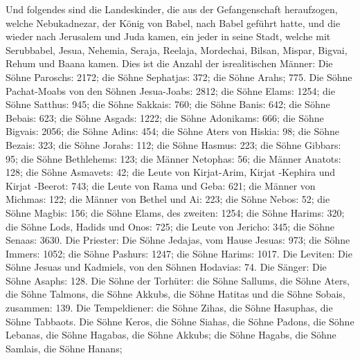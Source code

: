  Und folgendes sind die Landeskinder, die aus der
Gefangenschaft heraufzogen, welche Nebukadnezar, der König von Babel,
nach Babel geführt hatte, und die wieder nach Jerusalem und Juda kamen,
ein jeder in seine Stadt,  welche mit Serubbabel, Jesua,
Nehemia, Seraja, Reelaja, Mordechai, Bilsan, Mispar, Bigvai, Rehum und
Baana kamen. Dies ist die Anzahl der isrealitischen Männer:
 Die Söhne Paroschs: 2172;  die Söhne
Sephatjas: 372;  die Söhne Arahs; 775.  Die
Söhne Pachat-Moabs von den Söhnen Jesua-Joabs: 2812;  die
Söhne Elams: 1254;  die Söhne Satthus: 945; 
die Söhne Sakkais: 760;  die Söhne Banis: 642;
 die Söhne Bebais: 623;  die Söhne Asgads:
1222;  die Söhne Adonikams: 666;  die
Söhne Bigvais: 2056;  die Söhne Adins: 454;
 die Söhne Aters von Hiskia: 98;  die
Söhne Bezais: 323;  die Söhne Jorahs: 112;
 die Söhne Hasmus: 223;  die Söhne
Gibbars: 95;  die Söhne Bethlehems: 123; 
die Männer Netophas: 56;  die Männer Anatots: 128;
 die Söhne Asmavets: 42;  die Leute von
Kirjat-Arim, Kirjat -Kephira und Kirjat -Beerot: 743; 
die Leute von Rama und Geba: 621;  die Männer von
Michmas: 122;  die Männer von Bethel und Ai: 223;
 die Söhne Nebos: 52;  die Söhne Magbis:
156;  die Söhne Elams, des zweiten: 1254; 
die Söhne Harims: 320;  die Söhne Lods, Hadids und Onos:
725;  die Leute von Jericho: 345;  die
Söhne Senaas: 3630.  Die Priester: Die Söhne Jedajas, vom
Hause Jesuas: 973;  die Söhne Immers: 1052;
 die Söhne Pashurs: 1247;  die Söhne
Harims: 1017.  Die Leviten: Die Söhne Jesuas und
Kadmiels, von den Söhnen Hodavias: 74.  Die Sänger: Die
Söhne Asaphs: 128.  Die Söhne der Torhüter: die Söhne
Sallums, die Söhne Aters, die Söhne Talmons, die Söhne Akkubs, die Söhne
Hatitas und die Söhne Sobais, zusammen: 139.  Die
Tempeldiener: die Söhne Zihas, die Söhne Hasuphas, die Söhne Tabbaots.
 Die Söhne Keros, die Söhne Siahas, die Söhne Padons,
 die Söhne Lebanas, die Söhne Hagabas, die Söhne Akkubs;
 die Söhne Hagabs, die Söhne Samlais, die Söhne Hanans;

